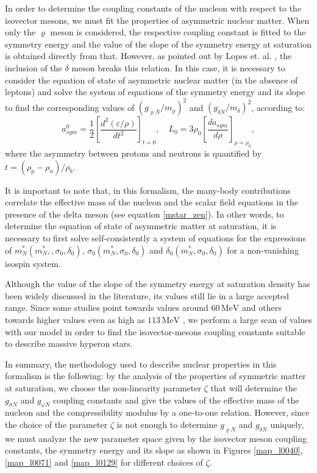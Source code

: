 \documentclass[twocolumn,showpacs,aps]{revtex4}
\begin{document}
 In order to determine the coupling constants of the nucleon with respect to the isovector mesons, 
 we must fit the properties of asymmetric nuclear matter.
 When only the $\varrho$ meson is considered, the respective coupling constant is fitted to the symmetry energy and
 the value of the slope of the symmetry energy at saturation is obtained directly from that.
 However, as pointed out by Lopes et. al. \cite{Lopes:2014wda}, the inclusion of the $\delta$ meson breaks this relation.
 In this case, it is necessary to consider the equation of state of asymmetric nuclear matter (in the absence of leptons)
 and solve the system of equations of the symmetry energy and its slope to find the corresponding values of $(g_{\varrho N}/m_{\varrho})^2$
 and $(g_{\delta N}/m_{\delta})^2$, according to:
 \begin{equation}
\label{symmetry}
a_{sym}^0= \frac{1}{2} \left[ \frac{d^2(\varepsilon/\rho)}{dt^2} \right]_{t=0},
\quad
L_0= 3 \rho_0 \left[ \frac{d a_{sym}}{d \rho} \right]_{\rho=\rho_0},
\end{equation}
where the asymmetry between protons and neutrons is quantified by $t=(\rho_p-\rho_n)/\rho_b$.

It is important to note that, in this formalism, the many-body contributions correlate the effective mass of the nucleon and 
the scalar field equations in the presence of the delta meson (see equation \ref{mstar_zen}). 
In other words, to determine the equation of state of asymmetric matter at saturation, it is 
necessary to first solve self-consistently a system of equations for the expressions of $m^*_N(m^*_N,,\sigma_0, \delta_0)$, 
$\sigma_0(m^*_N,\sigma_0, \delta_0)$  and $\delta_0(m^*_N,\sigma_0, \delta_0)$
for a non-vanishing isospin system.

Although the value of the slope of the symmetry energy at saturation density has been widely discussed 
in the literature, its values still lie in a large accepted range.
Since some studies point towards values around $60 \,\mathrm{MeV}$ \cite{Chen:2005ti,Tsang:2012se} and others towards higher values even as high as $113 \,\mathrm{MeV}$ \cite{Steiner:2011ft,Lattimer:2012xj}, 
we perform a large scan of values with our model in order to find the isovector-mesons coupling constants suitable
to describe massive hyperon stars.
 
In summary, the methodology used to describe nuclear properties in this formalism is the following:
by the analysis of the properties of symmetric matter at saturation, we choose the non-linearity parameter $\zeta$
that will determine the $g_{\sigma N}$ and $g_{\omega N}$ coupling constants and give the values of the 
effective mass of the nucleon and the compressibility modulus by a one-to-one relation.
However, since the choice of the parameter $\zeta$ is not enough to determine
$g_{\varrho N}$ and $g_{\delta N}$ uniquely, we must analyze the new parameter space given by the isovector meson coupling constants,
the symmetry energy and its slope as shown in Figures \ref{map_l0040}, \ref{map_l0071} and \ref{map_l0129} for different choices of $\zeta$.
\end{document}
